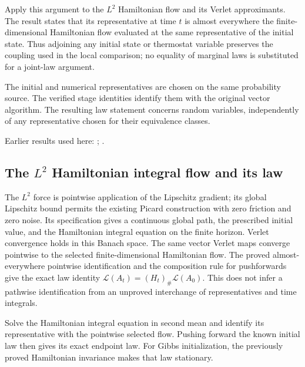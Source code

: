 \documentclass[11pt,a4paper]{report}
\begin{document}
Apply this argument to the \(L^{2}\) Hamiltonian flow and its Verlet approximants. The result states that its representative at time \(t\) is almost everywhere the finite-dimensional Hamiltonian flow evaluated at the same representative of the initial state. Thus adjoining any initial state or thermostat variable preserves the coupling used in the local comparison; no equality of marginal laws is substituted for a joint-law argument.



The initial and numerical representatives are chosen on the same probability source. The verified stage identities identify them with the original vector algorithm. The resulting law statement concerns random variables, independently of any representative chosen for their equivalence classes.



Earlier results used here: \cite[Section~3.13.2]{LangevinLean2026ULASC}; \cite[Section~3.13.5]{LangevinLean2026ULASC}.
\subsection{\texorpdfstring{The \(L^{2}\) Hamiltonian integral flow and its law}{The L² Hamiltonian integral flow and its law}}
\label{report-step-KineticLangevin-LpHamiltonianLaw-lean-3}


The \(L^{2}\) force is pointwise application of the Lipschitz gradient; its global Lipschitz bound permits the existing Picard construction with zero friction and zero noise. Its specification gives a continuous global path, the prescribed initial value, and the Hamiltonian integral equation on the finite horizon. Verlet convergence holds in this Banach space. The same vector Verlet maps converge pointwise to the selected finite-dimensional Hamiltonian flow. The proved almost-everywhere pointwise identification and the composition rule for pushforwards give the exact law identity \(\mathcal L(A_t)=(H_t)_\#\mathcal L(A_0)\). This does not infer a pathwise identification from an unproved interchange of representatives and time integrals.



Solve the Hamiltonian integral equation in second mean and identify its representative with the pointwise selected flow. Pushing forward the known initial law then gives its exact endpoint law. For Gibbs initialization, the previously proved Hamiltonian invariance makes that law stationary.
\end{document}
